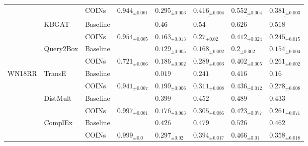 \begin{table}[!ht]
\begin{adjustbox}{width=\textwidth}
\begin{tabular}{llllllll}
         &           & COINs &  ${{0.944}_{\pm 0.001}}$ &     $\mathbf{{0.295}_{\pm 0.003}}$ &  $\underline{{0.416}_{\pm 0.004}}$ &  $\underline{{0.552}_{\pm 0.004}}$ &  $\underline{{0.381}_{\pm 0.003}}$ \\
         & KBGAT & Baseline &                          &                         ${{0.46}}$ &                         ${{0.54}}$ &                        ${{0.626}}$ &                        ${{0.518}}$ \\
         &           & COINs &  ${{0.954}_{\pm 0.005}}$ &            ${{0.163}_{\pm 0.013}}$ &              ${{0.27}_{\pm 0.02}}$ &            ${{0.412}_{\pm 0.024}}$ &            ${{0.245}_{\pm 0.015}}$ \\
         & Query2Box & Baseline &                          &            ${{0.129}_{\pm 0.005}}$ &            ${{0.168}_{\pm 0.002}}$ &              ${{0.2}_{\pm 0.002}}$ &            ${{0.154}_{\pm 0.004}}$ \\
         &           & COINs &  ${{0.721}_{\pm 0.006}}$ &     $\mathbf{{0.186}_{\pm 0.002}}$ &     $\mathbf{{0.289}_{\pm 0.003}}$ &     $\mathbf{{0.402}_{\pm 0.005}}$ &     $\mathbf{{0.261}_{\pm 0.002}}$ \\
\midrule
WN18RR & TransE & Baseline &                          &                        ${{0.019}}$ &                        ${{0.241}}$ &                        ${{0.416}}$ &                         ${{0.16}}$ \\
         &           & COINs &  ${{0.941}_{\pm 0.007}}$ &     $\mathbf{{0.199}_{\pm 0.006}}$ &     $\mathbf{{0.311}_{\pm 0.008}}$ &     $\mathbf{{0.436}_{\pm 0.012}}$ &     $\mathbf{{0.278}_{\pm 0.008}}$ \\
         & DistMult & Baseline &                          &                        ${{0.399}}$ &                        ${{0.452}}$ &                        ${{0.489}}$ &                        ${{0.433}}$ \\
         &           & COINs &  ${{0.997}_{\pm 0.001}}$ &            ${{0.176}_{\pm 0.063}}$ &            ${{0.305}_{\pm 0.086}}$ &            ${{0.423}_{\pm 0.077}}$ &            ${{0.261}_{\pm 0.071}}$ \\
         & ComplEx & Baseline &                          &                        ${{0.426}}$ &                        ${{0.479}}$ &                        ${{0.526}}$ &                        ${{0.462}}$ \\
         &           & COINs &    ${{0.999}_{\pm 0.0}}$ &             ${{0.297}_{\pm 0.02}}$ &            ${{0.394}_{\pm 0.017}}$ &             ${{0.466}_{\pm 0.01}}$ &            ${{0.358}_{\pm 0.018}}$ \\

\end{tabular}
\end{adjustbox}
\end{table}
